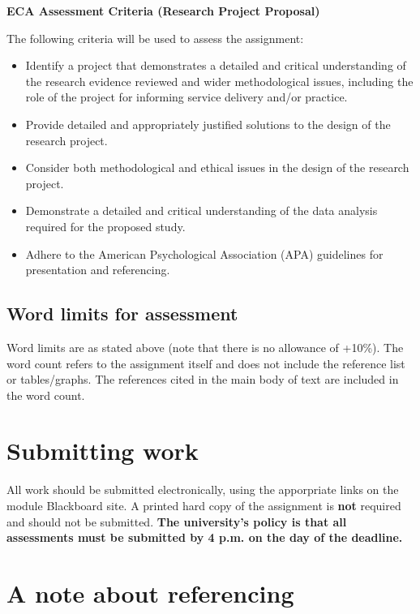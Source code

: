 \documentclass[
]{book}
\providecommand{\tightlist}{%
  \setlength{\itemsep}{0pt}\setlength{\parskip}{0pt}}
\begin{document}
\textbf{ECA Assessment Criteria (Research Project Proposal)}

The following criteria will be used to assess the assignment:

\begin{itemize}
\tightlist
\item
  Identify a project that demonstrates a detailed and critical understanding of the research evidence reviewed and wider methodological issues, including the role of the project for informing service delivery and/or practice.
\item
  Provide detailed and appropriately justified solutions to the design of the research project.
\item
  Consider both methodological and ethical issues in the design of the research project.
\item
  Demonstrate a detailed and critical understanding of the data analysis required for the proposed study.
\item
  Adhere to the American Psychological Association (APA) guidelines for presentation and referencing.
\end{itemize}

\hypertarget{word-limits-for-assessment}{%
\subsection{Word limits for assessment}\label{word-limits-for-assessment}}

Word limits are as stated above (note that there is no allowance of +10\%). The word count refers to the assignment itself and does not include the reference list or tables/graphs. The references cited in the main body of text are included in the word count.

\hypertarget{submitting-work}{%
\section{Submitting work}\label{submitting-work}}

All work should be submitted electronically, using the apporpriate links on the module Blackboard site. A printed hard copy of the assignment is \textbf{not} required and should not be submitted. \textbf{The university's policy is that all assessments must be submitted by 4 p.m. on the day of the deadline.}

\hypertarget{a-note-about-referencing}{%
\section{A note about referencing}\label{a-note-about-referencing}}
\end{document}
